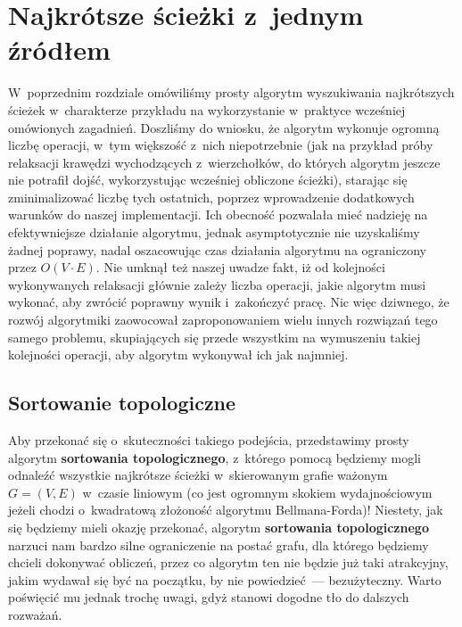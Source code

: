 \chapter{Najkrótsze ścieżki z~jednym źródłem}
\thispagestyle{chapterBeginStyle}






W~poprzednim rozdziale omówiliśmy prosty algorytm wyszukiwania najkrótszych ścieżek w~charakterze przykładu na wykorzystanie w~praktyce wcześniej omówionych zagadnień.
Doszliśmy do wniosku, że algorytm wykonuje ogromną liczbę operacji, w~tym większość z~nich niepotrzebnie (jak na przykład próby relaksacji krawędzi wychodzących z~wierzchołków, do których algorytm jeszcze nie potrafił dojść, wykorzystując wcześniej obliczone ścieżki), starając się zminimalizować liczbę tych ostatnich, poprzez wprowadzenie dodatkowych warunków do naszej implementacji.
Ich obecność pozwalała mieć nadzieję na efektywniejsze działanie algorytmu, jednak asymptotycznie nie uzyskaliśmy żadnej poprawy, nadal oszacowując czas działania algorytmu na ograniczony przez $O \left( V \cdot E \right)$.
Nie umknął też naszej uwadze fakt, iż od kolejności wykonywanych relaksacji głównie zależy liczba operacji, jakie algorytm musi wykonać, aby zwrócić poprawny wynik i~zakończyć pracę.
Nic więc dziwnego, że rozwój algorytmiki zaowocował zaproponowaniem wielu innych rozwiązań tego samego problemu, skupiających się przede wszystkim na wymuszeniu takiej kolejności operacji, aby algorytm wykonywał ich jak najmniej.




\section{Sortowanie topologiczne}




Aby przekonać się o~skuteczności takiego podejścia, przedstawimy prosty algorytm \textbf{sortowania topologicznego}, z~którego pomocą będziemy mogli odnaleźć wszystkie najkrótsze ścieżki w~skierowanym grafie ważonym $G = \left( V, E \right)$ w~czasie liniowym (co jest ogromnym skokiem wydajnościowym jeżeli chodzi o~kwadratową złożoność algorytmu Bellmana-Forda)!
Niestety, jak się będziemy mieli okazję przekonać, algorytm \textbf{sortowania topologicznego} narzuci nam bardzo silne ograniczenie na postać grafu, dla którego będziemy chcieli dokonywać obliczeń, przez co algorytm ten nie będzie już taki atrakcyjny, jakim wydawał się być na początku, by nie powiedzieć~--- bezużyteczny.
Warto poświęcić mu jednak trochę uwagi, gdyż stanowi dogodne tło do dalszych rozważań.

